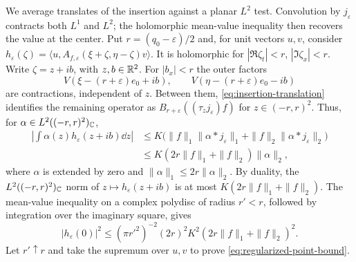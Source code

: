 We average translates of the insertion against a planar $L^2$ test.
Convolution by $j_\varepsilon$ contracts both $L^1$ and $L^2$;
the holomorphic mean-value inequality then recovers the value at
the center. Put $r=(q_0-\varepsilon)/2$ and, for unit vectors $u,v$, consider
$h_\varepsilon(\zeta)=
\langle u,A_{f,\varepsilon}(\xi+\zeta,\eta-\zeta)v\rangle$.
It is holomorphic for $|\Re\zeta_t|<r$, $|\Im\zeta_x|<r$.
Write $\zeta=z+ib$, with $z,b\in\mathbb{R}^2$. For $|b_x|<r$ the outer
factors
\begin{equation}
 V(\xi-(r+\varepsilon)e_0+ib),\qquad
 V(\eta-(r+\varepsilon)e_0-ib)
\end{equation}
are contractions, independent of $z$. Between them,
\eqref{eq:insertion-translation} identifies the remaining operator as
$B_{r+\varepsilon}((\tau_zj_\varepsilon)f)$ for
$z\in(-r,r)^2$. Thus, for $\alpha\in L^2((-r,r)^2)_{\mathbb{C}}$,
\begin{equation}
\begin{split}
 \left|\int\alpha(z)h_\varepsilon(z+ib)\dd z\right|
 &\leq K\bigl(\|f\|_1\|\alpha*j_\varepsilon\|_1
              +\|f\|_2\|\alpha*j_\varepsilon\|_2\bigr)\\
 &\leq K(2r\|f\|_1+\|f\|_2)\|\alpha\|_2,
\end{split}
\end{equation}
where $\alpha$ is extended by zero and $\|\alpha\|_1\leq2r\|\alpha\|_2$.
By duality, the $L^2((-r,r)^2)_{\mathbb{C}}$ norm of
$z\mapsto h_\varepsilon(z+ib)$ is at most $K(2r\|f\|_1+\|f\|_2)$.
The mean-value inequality on a complex polydisc
of radius $r'<r$, followed by integration over the imaginary square,
gives
\begin{equation}
 |h_\varepsilon(0)|^2\leq(\pi r'^2)^{-2}(2r)^2K^2
                    (2r\|f\|_1+\|f\|_2)^2.
\end{equation}
Let $r'\uparrow r$ and take the supremum over $u,v$ to prove
\eqref{eq:regularized-point-bound}.

